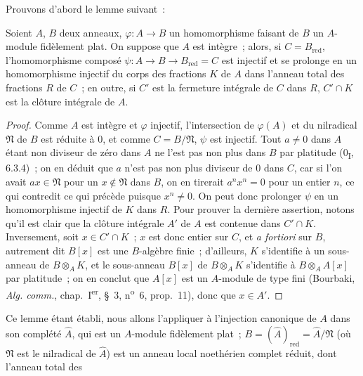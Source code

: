 Prouvons d'abord le lemme suivant~:

\begin{lemma}[23.2.7.1]
\label{0.23.2.7.1-fr}
Soient $A$, $B$ deux anneaux, $\varphi:A\to B$ un homomorphisme faisant de $B$
un $A$-module fidèlement plat. On suppose que $A$ est intègre~; alors, si
$C=B_{\mathrm{red}}$, l'homomorphisme composé
$\psi:A\to B\to B_{\mathrm{red}}=C$ est injectif et se prolonge en un
homomorphisme injectif du corps des fractions $K$ de $A$ dans l'anneau total
des fractions $R$ de $C$~; en outre, si $C'$ est la fermeture intégrale de
$C$ dans $R$, $C'\cap K$ est la clôture intégrale de $A$.
\end{lemma}

\begin{proof}
Comme $A$ est intègre et $\varphi$ injectif, l'intersection de $\varphi(A)$
et du nilradical $\mathfrak N$ de $B$ est réduite à $0$, et comme
$C=B/\mathfrak N$, $\psi$ est injectif. Tout $a\neq0$ dans $A$ étant non
diviseur de zéro dans $A$ ne l'est pas non plus dans $B$ par platitude
(0\textsubscript{I}, 6.3.4)~; on en déduit que $a$ n'est pas non plus diviseur
de $0$ dans $C$, car si l'on avait $ax\in\mathfrak N$ pour un
$x\notin\mathfrak N$ dans $B$, on en tirerait $a^nx^n=0$ pour un entier $n$,
ce qui contredit ce qui précède puisque $x^n\neq0$. On peut donc prolonger
$\psi$ en un homomorphisme injectif de $K$ dans $R$. Pour prouver la dernière
assertion, notons qu'il est clair que la clôture intégrale $A'$ de $A$ est
contenue dans $C'\cap K$. Inversement, soit $x\in C'\cap K$~; $x$ est donc
entier sur $C$, et \emph{a fortiori} sur $B$, autrement dit $B[x]$ est une
$B$-algèbre finie~; d'ailleurs, $K$ s'identifie à un sous-anneau de
$B\otimes_AK$, et le sous-anneau $B[x]$ de $B\otimes_AK$ s'identifie à
$B\otimes_AA[x]$ par platitude~; on en conclut que $A[x]$ est un $A$-module
de type fini (Bourbaki, \emph{Alg. comm.}, chap.~I\textsuperscript{er}, §~3,
n\textsuperscript{o}~6, prop.~11), donc que $x\in A'$.
\end{proof}

Ce lemme étant établi, nous allons l'appliquer à l'injection canonique de $A$
dans son complété $\widehat A$, qui est un $A$-module fidèlement plat~;
$B=(\widehat A)_{\mathrm{red}}=\widehat A/\mathfrak N$ (où $\mathfrak N$ est
le nilradical de $\widehat A$) est un anneau local noethérien complet réduit,
dont l'anneau total des


